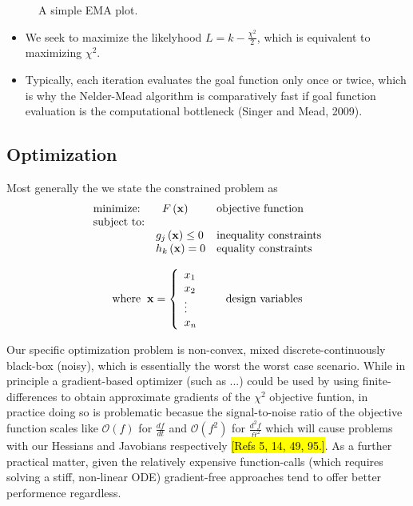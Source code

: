 \documentclass[10pt,a4paper]{article}
\begin{document}
\begin{figure}[htb]
    \centering
    \resizebox{14cm}{!}{}
    \caption{A simple EMA plot.\label{fig:convergence}}
\end{figure}

\begin{itemize}
\item We seek to maximize the likelyhood $L = k - \frac{\chi^2}{2}$, which is equivalent to maximizing $\chi^2$.
\item Typically, each iteration evaluates the goal function only once or twice, which is why the Nelder-Mead algorithm is comparatively fast if goal function evaluation is the computational bottleneck (Singer and Mead, 2009).
\end{itemize}

\subsection{Optimization}
Most generally the we state the constrained problem as 
\[
\begin{array}{lll}
\mbox{minimize:} & \hspace{2 mm} F\left(\mathbf{x}\right) & \mbox{objective function}\\
\mbox{subject to:} & & \\
& \centering g_j \left( \mathbf{x} \right) \leq 0 & \mbox{inequality constraints}\\
& \centering h_k \left(\mathbf{x} \right) = 0 & \mbox{equality constraints}
\end{array}
 \]

\[ 
\begin{array}{ll}
\mbox{where} \hspace{2 mm} \mathbf{x} = \left\{ \begin{array}{ll}

x_1 & \\
x_2 & \\
\vdots &\\
x_n &
\end{array} \right. & \mbox{design variables}
\end{array}
\]

Our specific optimization problem is non-convex, mixed discrete-continuously black-box (noisy), which is essentially the worst the worst case scenario. While in principle a gradient-based optimizer (such as ...) could be used by using finite-differences to obtain approximate gradients of the $\chi^2$ objective funtion, in practice doing so is problematic becasue the signal-to-noise ratio of the objective function scales like $\mathcal{O}(f)$ for $\frac{df}{dt}$ and $\mathcal{O}(f^2)$ for $\frac{d^2f}{ft^2}$ which will cause problems with our Hessians and Javobians respectively \hl{[Refs 5, 14, 49, 95.]}. As a further practical matter, given the relatively expensive function-calls (which requires solving a stiff, non-linear ODE) gradient-free approaches tend to offer better performence regardless. 
\end{document}
